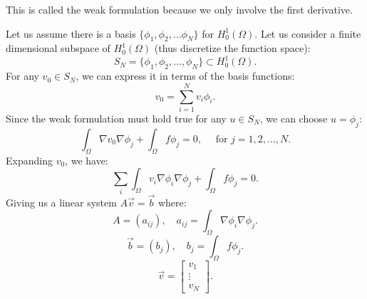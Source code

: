 \documentclass[../main/main.tex]{subfiles}
\begin{document}
\begin{remark}
    This is called the weak formulation because we only involve the first derivative.
\end{remark}
Let us assume there is a basis $\{\phi_1,\phi_2,\ldots\phi_N\} $ for $H^1_0(\Omega)$. Let us consider a finite dimensional subspace of $H^1_0(\Omega)$ (thus discretize the function space): \[
S_N  = \{\phi_1,\phi_2,\ldots,\phi_N\} \subset H^1_0(\Omega) 
.\] For any $ v_0 \in S_N$, we can express it in terms of the basis functions: \[
v_0 = \sum_{i=1}^{N} v_i \phi_i
.\] Since the weak formulation must hold true for any $u \in S_N$, we can choose $u = \phi_j$: \[
\int_\Omega \nabla v_0 \nabla \phi_j + \int_\Omega f \phi_j = 0, \quad \text{ for } j = 1,2,\ldots,N
.\] Expanding $ v_0$, we have: \[ 
\sum_{i}\int_\Omega  v_i\nabla \phi_i \nabla \phi_j + \int_\Omega f \phi_j = 0
.\] Giving us a linear system $A\vec{v} = \vec{b}$ where: \[
A = (a_{ij}), \quad a_{ij} = \int_{\Omega} \nabla \phi_i\nabla \phi_j
.\] \[
\vec{b} = (b_j), \quad b_j = \int_{\Omega} f \phi_j
.\] \[
\vec{v} = \begin{bmatrix} v_1\\\vdots\\v_N \end{bmatrix} 
.\] 
\end{document}
